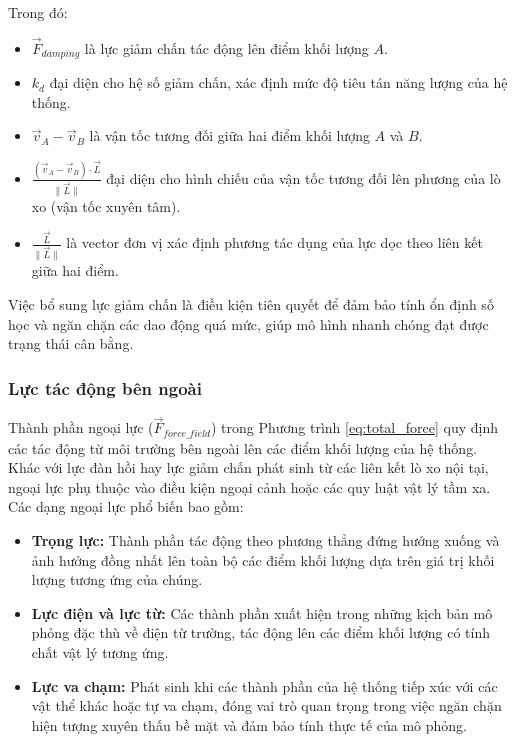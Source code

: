 \documentclass{report}
\begin{document}
Trong đó:
\begin{itemize}
    \item $\vec{F}_{damping}$ là lực giảm chấn tác động lên điểm khối lượng $A$.
    \item $k_d$ đại diện cho hệ số giảm chấn, xác định mức độ tiêu tán năng lượng của hệ thống.
    \item $\vec{v}_A - \vec{v}_B$ là vận tốc tương đối giữa hai điểm khối lượng $A$ và $B$.
    \item $\frac{(\vec{v}_A - \vec{v}_B) \cdot \vec{L}}{\|\vec{L}\|}$ đại diện cho hình chiếu của vận tốc tương đối lên phương của lò xo (vận tốc xuyên tâm).
    \item $\frac{\vec{L}}{\|\vec{L}\|}$ là vector đơn vị xác định phương tác dụng của lực dọc theo liên kết giữa hai điểm.
\end{itemize}

Việc bổ sung lực giảm chấn là điều kiện tiên quyết để đảm bảo tính ổn định số học và ngăn chặn các dao động quá mức, giúp mô hình nhanh chóng đạt được trạng thái cân bằng.


\subsubsection{Lực tác động bên ngoài}
Thành phần ngoại lực ($\vec{F}_{force\_field}$) trong Phương trình \ref{eq:total_force} quy định các tác động từ môi trường bên ngoài lên các điểm khối lượng của hệ thống. Khác với lực đàn hồi hay lực giảm chấn phát sinh từ các liên kết lò xo nội tại, ngoại lực phụ thuộc vào điều kiện ngoại cảnh hoặc các quy luật vật lý tầm xa. Các dạng ngoại lực phổ biến bao gồm:

\begin{itemize}
    \item \textbf{Trọng lực:} Thành phần tác động theo phương thẳng đứng hướng xuống và ảnh hưởng đồng nhất lên toàn bộ các điểm khối lượng dựa trên giá trị khối lượng tương ứng của chúng.
    \item \textbf{Lực điện và lực từ:} Các thành phần xuất hiện trong những kịch bản mô phỏng đặc thù về điện từ trường, tác động lên các điểm khối lượng có tính chất vật lý tương ứng.
    \item \textbf{Lực va chạm:} Phát sinh khi các thành phần của hệ thống tiếp xúc với các vật thể khác hoặc tự va chạm, đóng vai trò quan trọng trong việc ngăn chặn hiện tượng xuyên thấu bề mặt và đảm bảo tính thực tế của mô phỏng.
\end{itemize}
\end{document}
